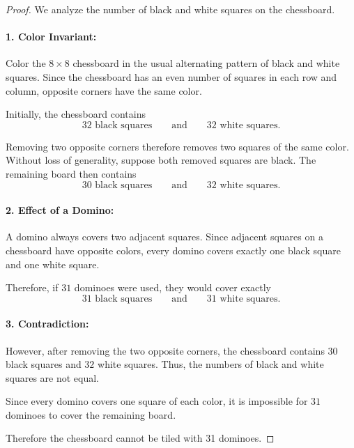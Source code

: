 \documentclass[12pt]{article}
\begin{document}
\begin{proof}

We analyze the number of black and white squares on the chessboard.

\paragraph{1. Color Invariant:}

Color the \(8\times8\) chessboard in the usual alternating pattern of
black and white squares. Since the chessboard has an even number of
squares in each row and column, opposite corners have the same color.

Initially, the chessboard contains
\[
32 \text{ black squares} \qquad\text{and}\qquad 32 \text{ white squares}.
\]

Removing two opposite corners therefore removes two squares of the same
color. Without loss of generality, suppose both removed squares are
black. The remaining board then contains
\[
30 \text{ black squares} \qquad\text{and}\qquad 32 \text{ white squares}.
\]

\paragraph{2. Effect of a Domino:}

A domino always covers two adjacent squares. Since adjacent squares on a
chessboard have opposite colors, every domino covers exactly one black
square and one white square.

Therefore, if \(31\) dominoes were used, they would cover exactly
\[
31 \text{ black squares} \qquad\text{and}\qquad
31 \text{ white squares}.
\]

\paragraph{3. Contradiction:}

However, after removing the two opposite corners, the chessboard
contains \(30\) black squares and \(32\) white squares. Thus, the
numbers of black and white squares are not equal.

Since every domino covers one square of each color, it is impossible for
\(31\) dominoes to cover the remaining board.

Therefore the chessboard cannot be tiled with 31 dominoes.

\end{proof}
\end{document}

